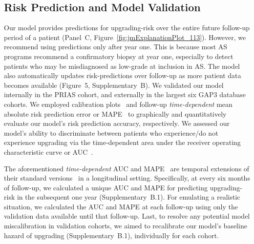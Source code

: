 \subsection{Risk Prediction and Model Validation}
Our model provides predictions for upgrading-risk over the entire future follow-up period of a patient (Panel~C, Figure~\ref{fig:jmExplanationPlot_113}). However, we recommend using predictions only after year one. This is because most AS programs recommend a confirmatory biopsy at year one, especially to detect patients who may be misdiagnosed as low-grade at inclusion in AS. The model also automatically updates risk-predictions over follow-up as more patient data becomes available (Figure~5, Supplementary~B). We validated our model internally in the PRIAS cohort, and externally in the largest six GAP3 database cohorts. We employed calibration plots~\citep{royston2013external,steyerberg2010assessing} and follow-up \textit{time-dependent} mean absolute risk prediction error or MAPE~\citep{rizopoulos2017dynamic} to graphically and quantitatively evaluate our model's risk prediction accuracy, respectively. We assessed our model's ability to discriminate between patients who experience/do not experience upgrading via the time-dependent area under the receiver operating characteristic curve or AUC~\citep{rizopoulos2017dynamic}. 

The aforementioned \textit{time-dependent} AUC and MAPE~\citep{rizopoulos2017dynamic} are temporal extensions of their standard versions~\citep{steyerberg2010assessing} in a longitudinal setting. Specifically, at every six months of follow-up, we calculated a unique AUC and MAPE for predicting upgrading-risk in the subsequent one year (Supplementary~B.1). For emulating a realistic situation, we calculated the AUC and MAPE at each follow-up using only the validation data available until that follow-up. Last, to resolve any potential model miscalibration in validation cohorts, we aimed to recalibrate our model's baseline hazard of upgrading (Supplementary~B.1), individually for each cohort.